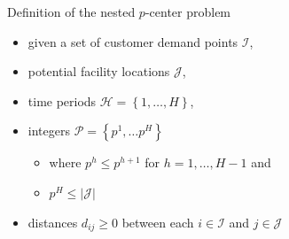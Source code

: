 \documentclass[utf8,aspectratio=169,ngerman,english]{beamer}
\begin{document}
\begin{frame}[allowframebreaks]{Definition of the nested $p$-center problem}
    \begin{block}{\vspace*{-4ex}}
        \begin{itemize}
            \item given a set of customer demand points $\mathcal I$,
            \item potential facility locations $\mathcal J$, 
            \item time periods $\mathcal H = \left \{1,\dots,H \right \}$, 
            \item integers $\mathcal P = \left \{p^1, \dots p^H \right \}$   
            \begin{itemize}
                \item where $p^h \leq p^{h+1}$ for $h = 1, \dots, H-1$ and
                \item $p^H \leq \left\lvert \mathcal J \right\rvert$
            \end{itemize}
            \item distances $d_{ij} \geq 0$ between each $i \in \mathcal I$ and $j \in \mathcal J$
        \end{itemize}
    \end{block}


\end{frame}
\end{document}
